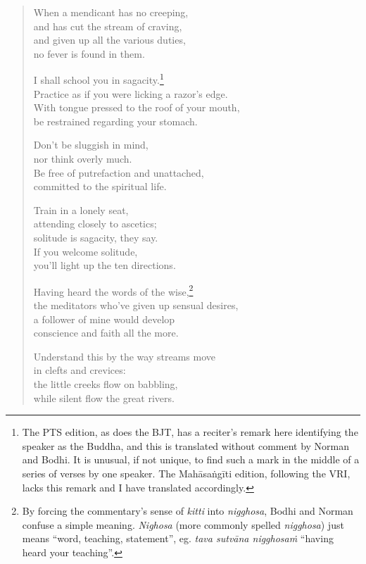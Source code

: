 \documentclass[12pt,openany]{book}%
\begin{document}
\begin{verse}
When a mendicant has no creeping, \\
and has cut the stream of craving, \\
and given up all the various duties, \\
no fever is found in them. 

I shall school you in sagacity.\footnote{The PTS edition, as does the BJT, has a reciter’s remark here identifying the speaker as the Buddha, and this is translated without comment by Norman and Bodhi. It is unusual, if not unique, to find such a mark in the middle of a series of verses by one speaker. The \textsanskrit{Mahāsaṅgīti} edition, following the VRI, lacks this remark and I have translated accordingly. } \\
Practice as if you were licking a razor’s edge. \\
With tongue pressed to the roof of your mouth, \\
be restrained regarding your stomach. 

Don’t be sluggish in mind, \\
nor think overly much. \\
Be free of putrefaction and unattached, \\
committed to the spiritual life. 

Train in a lonely seat, \\
attending closely to ascetics; \\
solitude is sagacity, they say. \\
If you welcome solitude, \\
you’ll light up the ten directions. 

Having heard the words of the wise,\footnote{By forcing the commentary’s sense of \textit{kitti} into \textit{nigghosa}, Bodhi and Norman confuse a simple meaning. \textit{Nighosa} (more commonly spelled \textit{nigghosa}) just means “word, teaching, statement”, eg. \textit{tava \textsanskrit{sutvāna} \textsanskrit{nigghosaṁ}} “having heard your teaching”. } \\
the meditators who’ve given up sensual desires, \\
a follower of mine would develop \\
conscience and faith all the more. 

Understand this by the way streams move \\
in clefts and crevices: \\
the little creeks flow on babbling, \\
while silent flow the great rivers. 


\end{verse}
\end{document}
